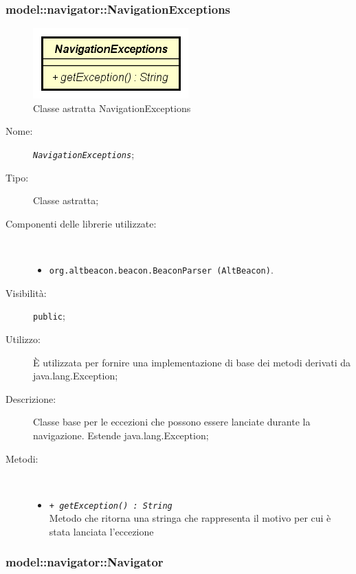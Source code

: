 \documentclass[../DefinizioneDiProdotto.tex]{subfiles}
\begin{document}
\subsubsection{model::navigator::NavigationExceptions}

    \begin{figure}[H]
        \centering
        \includegraphics{img/NavigationExceptions.png}
        \caption{Classe astratta NavigationExceptions}\label{fig:model::navigator::NavigationExceptions} 
    \end{figure}
    \begin{description}
\item[Nome:] \texttt{\textit{NavigationExceptions}};
\item[Tipo:] Classe astratta;
\item[Componenti delle librerie utilizzate:] \
\begin{itemize}
\item \texttt{org.altbeacon.beacon.BeaconParser (AltBeacon)}.

\end{itemize}
\item[Visibilità:] \texttt{public};
\item[Utilizzo:] È utilizzata per fornire una implementazione di base dei metodi derivati da java.lang.Exception;
\item[Descrizione:] Classe base per le eccezioni che possono essere lanciate durante la navigazione. Estende java.lang.Exception;
\item[Metodi:] \
\begin{itemize}
\item \texttt{+ \textit{getException() : String}}\\
Metodo che ritorna una stringa che rappresenta il motivo per cui è stata lanciata l'eccezione
 \end{itemize}
\end{description}

\subsubsection{model::navigator::Navigator}
\end{document}
